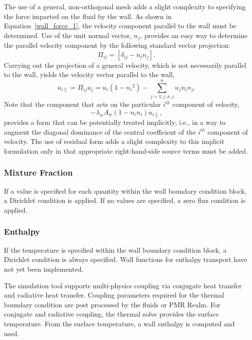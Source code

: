 The use of a general, non-orthogonal mesh adds a slight complexity to 
specifying the force imparted on the fluid by the wall.
As shown in Equation~\ref{wall_force_1}, the velocity component parallel to 
the wall must be determined. Use of the unit normal vector, $n_j$, 
provides an easy way to determine the parallel velocity component by the 
following standard vector projection:
%
\begin{equation}
        \Pi_{ij} = \left [ \delta_{ij} - n_i n_j \right].
\label{proj_oper}
\end{equation}
%
Carrying out the projection of a general velocity,
which is not necessarily parallel to the wall, yields the velocity vector 
parallel to the wall,
%
\begin{equation}
        u_{i\|} = \Pi_{ij} {u}_j = u_i\left(1-{n_i}^2\right)
        -\sum_{j=1;j\neq j}^{n} u_j n_i n_j.
\label{proj_operU}
\end{equation}
%
Note that the component that acts on the particular $i^{th}$ component of 
velocity,
%
\begin{equation}
        -\lambda_w A_w \left(1-n_i n_i\right) u_{i\|} ,
\label{implicit_shear}
\end{equation}
%
provides a form that can be potentially treated implicitly; i.e., in a way to 
augment the diagonal dominance of the central coefficient of the $i^{th}$ 
component of velocity. The use of residual form adds a slight complexity to
this implicit formulation only in that appropriate right-hand-side source terms
must be added.

\subsubsection{Mixture Fraction}
If a value is specified for each quantity within the wall boundary condition block, a Dirichlet condition
is applied. If no values are specified, a zero flux condition is applied.

\subsubsection{Enthalpy}
If the temperature is specified within the wall boundary condition block, a Dirichlet condition
is always specified. Wall functions for enthalpy transport have not yet been implemented. 

The simulation tool supports multi-physics coupling via conjugate heat transfer and radiative heat transfer.
Coupling parameters required for the thermal boundary condition are post processed by the fluids or PMR Realm.
For conjugate and radiative coupling, the thermal solve provides the surface temperature. From the surface temperature, 
a wall enthalpy is computed and used.

